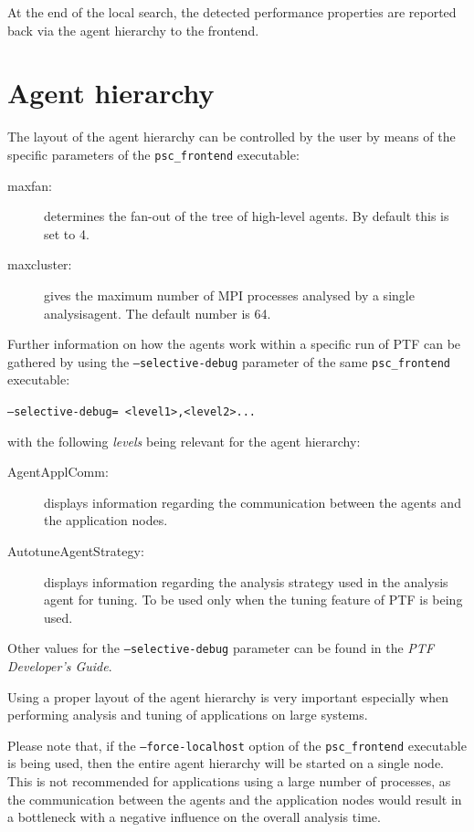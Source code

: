 \documentclass[11pt,oneside,a4paper]{book}
\newenvironment{code}%
{
\addtolength{\leftskip}{0.5cm}}%
{

}
\begin{document}
At the end of the local search, the detected performance properties are reported back via the agent hierarchy to the frontend.

\section{Agent hierarchy}
The layout of the agent hierarchy can be controlled by the user by means of the specific parameters of the \texttt{psc\_frontend} executable:

\begin{description}
	\item[maxfan:] determines the fan-out of the tree of high-level agents. By default this is set to 4.
	\item[maxcluster:] gives the maximum number of MPI processes analysed by a single analysisagent. The default number is 64.
\end{description}

Further information on how the agents work within a specific run of PTF can be gathered by using the \texttt{--selective-debug} parameter of the same \texttt{psc\_frontend} executable:

\begin{code}
 \texttt{--selective-debug= \textless level1\textgreater,\textless level2\textgreater... }
\end{code}

with the following \textit{levels} being relevant for the agent hierarchy:
\begin{description}
	\item[AgentApplComm:] displays information regarding the communication between the agents and the application nodes.
	\item[AutotuneAgentStrategy:] displays information regarding the analysis strategy used in the analysis agent for tuning. To be used only when the tuning feature of PTF is being used.	
\end{description}

Other values for the \texttt{--selective-debug} parameter can be found in the \textit{PTF Developer's Guide}.

Using a proper layout of the agent hierarchy is very important especially when performing analysis and tuning of applications on large systems.

Please note that, if the \texttt{--force-localhost} option of the \texttt{psc\_frontend} executable is being used, then the entire agent hierarchy will be started on a single node. This is not recommended for applications using a large number of processes, as the communication between the agents and the application nodes would result in a bottleneck with a negative influence on the overall analysis time.
\end{document}
